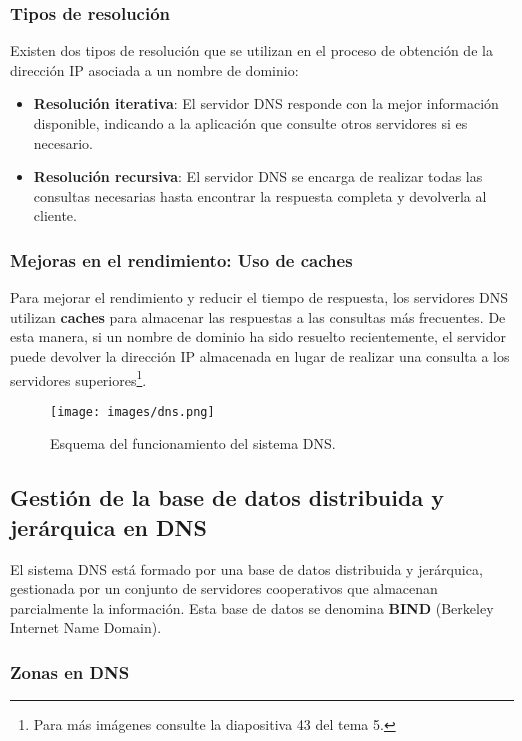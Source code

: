 \documentclass[a4paper,12pt]{article}
\begin{document}
\subsubsection{Tipos de resolución}

Existen dos tipos de resolución que se utilizan en el proceso de obtención de la dirección IP asociada a un nombre de dominio:

\begin{itemize}
    \item \textbf{Resolución iterativa}: El servidor DNS responde con la mejor información disponible, indicando a la aplicación que consulte otros servidores si es necesario.
    \item \textbf{Resolución recursiva}: El servidor DNS se encarga de realizar todas las consultas necesarias hasta encontrar la respuesta completa y devolverla al cliente.
\end{itemize}

\subsubsection{Mejoras en el rendimiento: Uso de caches}

Para mejorar el rendimiento y reducir el tiempo de respuesta, los servidores DNS utilizan \textbf{caches} para almacenar las respuestas a las consultas más frecuentes. De esta manera, si un nombre de dominio ha sido resuelto recientemente, el servidor puede devolver la dirección IP almacenada en lugar de realizar una consulta a los servidores superiores\footnote{Para más imágenes consulte la diapositiva 43 del tema 5.}.

\begin{figure}[H]
    \centering
    \texttt{[image: images/dns.png]}
    \caption{Esquema del funcionamiento del sistema DNS.}
    \label{fig:dns}
\end{figure}

\subsection{Gestión de la base de datos distribuida y jerárquica en DNS}

El sistema DNS está formado por una base de datos distribuida y jerárquica, gestionada por un conjunto de servidores cooperativos que almacenan parcialmente la información. Esta base de datos se denomina \textbf{BIND} (Berkeley Internet Name Domain). 

\subsubsection{Zonas en DNS}
\end{document}
